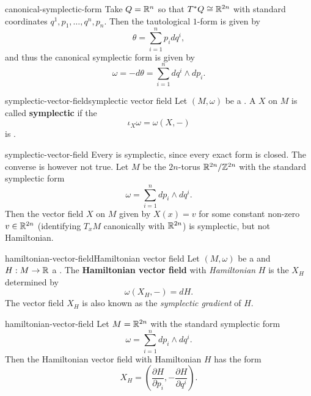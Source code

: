 \begin{example}{canonical-symplectic-form}
    Take $Q = \mathbb{R}^n$ so that $T^* Q \cong \mathbb{R}^{2n}$ with standard coordinates $q^1, p_1, \ldots, q^n, p_n$. Then the tautological $1$-form is given by
    \[ \theta = \sum_{i = 1}^{n} p_i dq^i , \]
    and thus the canonical symplectic form is given by
    \[ \omega = -d \theta = \sum_{i = 1}^{n} d q^i \wedge d p_i. \]
\end{example}

\begin{topic}{symplectic-vector-field}{symplectic vector field}
    Let $(M, \omega)$ be a . A  $X$ on $M$ is called \textbf{symplectic} if the 
    \[ \iota_X \omega = \omega(X, -) \]
    is .
\end{topic}

\begin{example}{symplectic-vector-field}
    Every  is symplectic, since every exact form is closed. The converse is however not true. Let $M$ be the $2n$-torus $\mathbb{R}^{2n}/\mathbb{Z}^{2n}$ with the standard symplectic form
    \[ \omega = \sum_{i = 1}^{n} dp_i \wedge dq^i . \]
    Then the vector field $X$ on $M$ given by $X(x) = v$ for some constant non-zero $v \in \mathbb{R}^{2n}$ (identifying $T_x M$ canonically with $\mathbb{R}^{2n}$) is symplectic, but not Hamiltonian.
\end{example}

\begin{topic}{hamiltonian-vector-field}{Hamiltonian vector field}
    Let $(M, \omega)$ be a  and $H : M \to \mathbb{R}$ a . The \textbf{Hamiltonian vector field} with \textit{Hamiltonian} $H$ is the  $X_H$ determined by
    \[ \omega(X_H, -) = dH . \]
    The vector field $X_H$ is also known as the \textit{symplectic gradient} of $H$.
\end{topic}

\begin{example}{hamiltonian-vector-field}
    Let $M = \mathbb{R}^{2n}$ with the standard symplectic form
    \[ \omega = \sum_{i = 1}^{n} dp_i \wedge dq^i . \]
    Then the Hamiltonian vector field with Hamiltonian $H$ has the form
    \[ X_H = \left(\frac{\partial H}{\partial p_i}, -\frac{\partial H}{\partial q^i} \right) . \]
\end{example}


